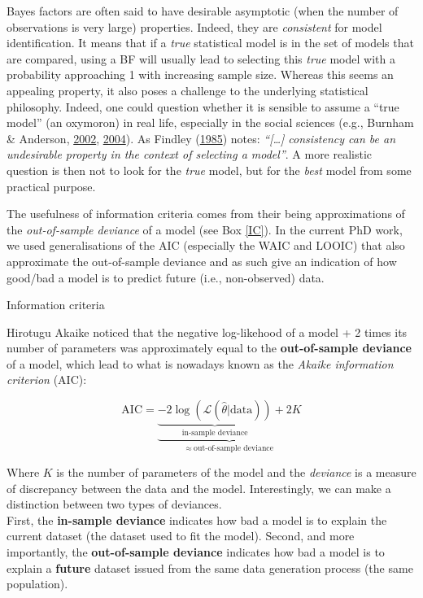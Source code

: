 \documentclass[a4paper,12pt,twoside,openright,oldfontcommands]{memoir}
\begin{document}
Bayes factors are often said to have desirable asymptotic (when the
number of observations is very large) properties. Indeed, they are
\emph{consistent} for model identification. It means that if a
\emph{true} statistical model is in the set of models that are compared,
using a BF will usually lead to selecting this \emph{true} model with a
probability approaching 1 with increasing sample size. Whereas this
seems an appealing property, it also poses a challenge to the underlying
statistical philosophy. Indeed, one could question whether it is
sensible to assume a ``true model'' (an oxymoron) in real life,
especially in the social sciences (e.g., Burnham \& Anderson,
\protect\hyperlink{ref-burnham_model_2002}{2002},
\protect\hyperlink{ref-burnham_multimodel_2004}{2004}). As Findley
(\protect\hyperlink{ref-findley_unbiasedness_1985}{1985}) notes:
\emph{``{[}\ldots{}{]} consistency can be an undesirable property in the
context of selecting a model''}. A more realistic question is then not
to look for the \emph{true} model, but for the \emph{best} model from
some practical purpose.

The usefulness of information criteria comes from their being
approximations of the \emph{out-of-sample deviance} of a model (see Box
\ref{IC}). In the current PhD work, we used generalisations of the AIC
(especially the WAIC and LOOIC) that also approximate the out-of-sample
deviance and as such give an indication of how good/bad a model is to
predict future (i.e., non-observed) data.

\vspace{2mm}

\begin{mybox}[label = IC]{Information criteria}

Hirotugu Akaike noticed that the negative log-likehood of a model + 2 times its number of parameters was approximately equal to the \textbf{out-of-sample deviance} of a model, which lead to what is nowadays known as the \textit{Akaike information criterion} (AIC):

$$\text{AIC} = \underbrace{\underbrace{-2\log(\mathcal{L}(\hat{\theta}|\text{data}))}_{\text{in-sample deviance}} + 2K}_{\approx\ \text{out-of-sample deviance}}$$

Where $K$ is the number of parameters of the model and the \textit{deviance} is a measure of discrepancy between the data and the model. Interestingly, we can make a distinction between two types of deviances.\\

First, the \textbf{in-sample deviance} indicates how bad a model is to explain the current dataset (the dataset used to fit the model). Second, and more importantly, the \textbf{out-of-sample deviance} indicates how bad a model is to explain a \textbf{future} dataset issued from the same data generation process (the same population).

\end{mybox}
\end{document}
